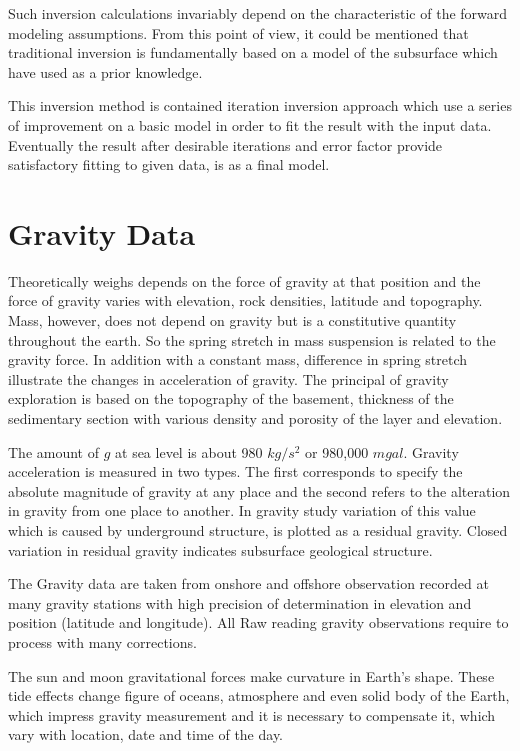 Such inversion calculations invariably depend on the characteristic of the forward modeling assumptions. From this point of view, it could be mentioned  that traditional inversion is fundamentally based on a model of the subsurface which have used as a prior knowledge.

This inversion method is contained iteration inversion approach which use a series of improvement on a basic model in order to fit the result with the input data. Eventually the result after desirable iterations and error factor provide  satisfactory fitting to given data, is as a final model.


\section{Gravity Data}

Theoretically weighs depends on the force of gravity at that position and the force of gravity varies with elevation, rock densities, latitude and topography. Mass, however, does not depend on gravity but is a constitutive quantity throughout the earth. So the spring stretch in mass suspension is related to the gravity force. In addition with a constant mass, difference in spring stretch illustrate the changes in acceleration of gravity. The principal of gravity exploration is based on the topography of the basement, thickness of the sedimentary section with various density and porosity of the layer and elevation.

The amount of $g$ at sea level is about 980 $kg/s^2$ or 980,000 $mgal$. Gravity acceleration is measured in two types. The first corresponds to specify the absolute magnitude of gravity at any place and the second refers to the alteration in gravity from one place to another. In gravity study variation of this value which is caused by underground structure, is plotted as a residual gravity. Closed variation in residual gravity indicates subsurface geological structure.

The Gravity data are taken from onshore and offshore observation recorded at many gravity stations with high precision of determination in elevation and position (latitude and longitude). All Raw reading gravity observations require to process with many corrections.

The sun and moon gravitational forces make curvature in Earth's shape. These tide effects change figure of oceans, atmosphere and even solid body of the Earth, which impress gravity measurement and it is necessary to compensate it, which vary with location, date and time of the day.

